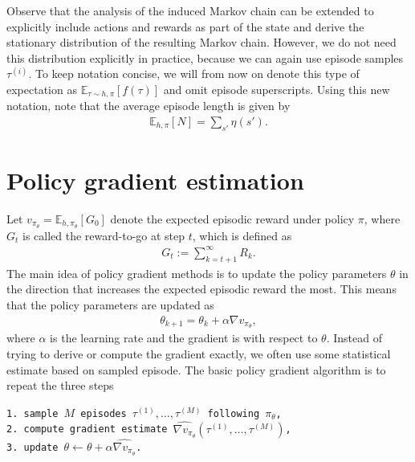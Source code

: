 \documentclass[a4paper]{report}
\theoremstyle{definition}
\theoremstyle{plain}
\begin{document}
Observe that the analysis of the induced Markov chain can be extended to
explicitly include actions and rewards as part of the state and derive the
stationary distribution of the resulting Markov chain. However, we do not need
this distribution explicitly in practice, because we can again use episode
samples $\tau^{(i)}$. To keep notation concise, we will from now on denote this
type of expectation as $\mathbb{E}_{\tau \sim h,\pi}[f(\tau)]$ and omit episode
superscripts.
%
Using this new notation, note that the average episode length is given by
\begin{align*}
  \mathbb{E}_{h, \pi} [ N ]= \sum_{s'} \eta(s') .
\end{align*}

\section*{Policy gradient estimation}

Let $v_{\pi_{\theta}} = \mathbb{E}_{h,\pi_{\theta}}[G_{0}]$ denote the expected
episodic reward under policy $\pi$, where $G_{t}$ is called the reward-to-go at
step $t$, which is defined as
\begin{align*}
  G_{t} := \sum_{k=t+1}^{\infty} R_{k} .
\end{align*}
The main idea of policy gradient methods is to update the policy parameters
$\theta$ in the direction that increases the expected episodic reward the most. This
means that the policy parameters are updated as
\begin{align*}
  \theta_{k+1} = \theta_{k} + \alpha \nabla v_{\pi_{\theta}} ,
\end{align*}
where $\alpha$ is the learning rate and the gradient is with respect to
$\theta$. Instead of trying to derive or compute the gradient exactly, we often
use some statistical estimate based on sampled episode. The basic policy
gradient algorithm is to repeat the three steps

\vspace{1em}
\noindent
\hspace*{1em} \texttt{1. sample $M$ episodes $\tau^{(1)}, \dots, \tau^{(M)}$ following $\pi_{\theta}$,}\\
\hspace*{1em} \texttt{2. compute gradient estimate $\widehat{\nabla v_{\pi_{\theta}}}(\tau^{(1)}, \dots, \tau^{(M)})$,} \\
\hspace*{1em} \texttt{3. update $\theta \leftarrow \theta + \alpha \widehat{\nabla v_{\pi_{\theta}}}$.}
\end{document}
